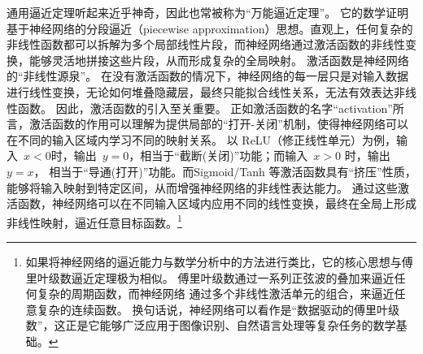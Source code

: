 通用逼近定理听起来近乎神奇，因此也常被称为“万能逼近定理”。
它的数学证明基于神经网络的分段逼近（piecewise approximation）思想。直观上，任何复杂的非线性函数都可以拆解为多个局部线性片段，而神经网络通过激活函数的非线性变换，能够灵活地拼接这些片段，从而形成复杂的全局映射。
激活函数是神经网络的“非线性源泉”。
在没有激活函数的情况下，神经网络的每一层只是对输入数据进行线性变换，无论如何堆叠隐藏层，最终只能拟合线性关系，无法有效表达非线性函数。
因此，激活函数的引入至关重要。
正如激活函数的名字“activation”所言，激活函数的作用可以理解为提供局部的“打开-关闭”机制，使得神经网络可以在不同的输入区域内学习不同的映射关系。
以 ReLU（修正线性单元）为例，输入~$x<0$时，输出~$y= 0$，相当于“截断(关闭)”功能；而输入~$x>0$ 时，输出~$y=x$， 相当于“导通(打开)”功能。而Sigmoid/Tanh 等激活函数具有“挤压”性质，能够将输入映射到特定区间，从而增强神经网络的非线性表达能力。
通过这些激活函数，神经网络可以在不同输入区域内应用不同的线性变换，最终在全局上形成非线性映射，逼近任意目标函数。\footnote{如果将神经网络的逼近能力与数学分析中的方法进行类比，它的核心思想与傅里叶级数逼近定理极为相似。
傅里叶级数通过一系列正弦波的叠加来逼近任何复杂的周期函数，而神经网络 通过多个非线性激活单元的组合，来逼近任意复杂的连续函数。
换句话说，神经网络可以看作是“数据驱动的傅里叶级数”，这正是它能够广泛应用于图像识别、自然语言处理等复杂任务的数学基础。}
%
%
%
%
